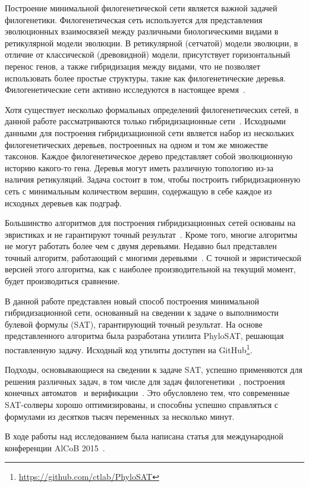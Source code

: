 \startprefacepage

Построение минимальной филогенетической сети является важной задачей филогенетики.
Филогенетическая сеть используется для представления эволюционных взаимосвязей между различными биологическими видами в ретикулярной модели эволюции.
В ретикулярной (сетчатой) модели эволюции, в отличие от классической (древовидной) модели, присутствует горизонтальный перенос генов, а также гибридизация между видами, что не позволяет использовать более простые структуры, такие как филогенетические деревья.
Филогенетические сети активно исследуются в настоящее время~\cite{huson2010phylogenetic, morrison2011introduction, 
nakhleh2011evolutionary}.

Хотя существует несколько формальных определений филогенетических сетей, в данной работе рассматриваются только гибридизационные сети~\cite{semple2006hybridization, chen2010hybridnet}.
Исходными данными для построения гибридизационной сети является набор из нескольких филогенетических деревьев, построенных на одном и том же множестве таксонов.
Каждое филогенетическое дерево представляет собой эволюционную историю какого-то гена.
Деревья могут иметь различную топологию из-за наличия ретикуляций.
Задача состоит в том, чтобы построить гибридизационную сеть с минимальным количеством вершин, содержащую в себе каждое из исходных деревьев как подграф.

Большинство алгоритмов для построения гибридизационных сетей основаны на эвристиках и не гарантируют точный результат~\cite{wu2010close, park2012murpar}.
Кроме того, многие алгоритмы не могут работать более чем с двумя деревьями.
Недавно был представлен точный алгоритм, работающий с многими деревьями~\cite{wu2013algorithm}.
С точной и эвристической версией этого алгоритма, как с наиболее производительной на текущий момент, будет производиться сравнение.

В данной работе представлен новый способ построения минимальной гибридизационной сети, основанный на сведении к задаче о выполнимости булевой формулы (SAT), гарантирующий точный результат.
На основе представленного алгоритма была разработана утилита PhyloSAT, решающая поставленную задачу. Исходный код утилиты доступен на GitHub\footnote{\url{https://github.com/ctlab/PhyloSAT}}.

Подходы, основывающиеся на сведении к задаче SAT, успешно применяются для решения различных задач, в том числе для задач филогенетики~\cite{bonet2009efficiently}, построения конечных автоматов~\cite{heule2010exact} и верификации~\cite{biere2003bounded}.
Это обусловлено тем, что современные SAT-солверы хорошо оптимизированы, и способны успешно справляться с формулами из десятков тысяч переменных за несколько минут.

В ходе работы над исследованием была написана статья для международной конференции AlCoB 2015~\cite{ulyantsev2015constructing}.
